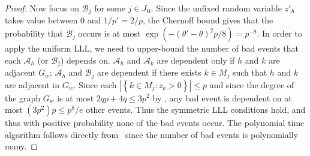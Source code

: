 \documentclass[11pt]{article}
\newcommand{\set}[1]{\left\{#1\right\}}
\newcommand{\calA}{{\mathscr A}}
\newcommand{\calB}{{\mathscr B}}
\newcommand{\cA}{{\mathscr A}}
\newcommand{\cB}{\mathscr{B}}
\newcommand{\sfH}{{\mathsf H}}
\begin{document}
\begin{proof}
Now focus on ${\calB}_j$ for some $j \in {J_\sfH}$.  Since the unfixed random variable $z'_h$ takes value between $0$ and $1/p' = 2/p$, the Chernoff bound gives that the probability that ${\calB}_j$ occurs is at most $\exp\left(-(\theta' - \theta)^2p/8\right) = p^{-8}$.
In order to apply the uniform LLL,  we need to upper-bound the number of bad events that each ${\calA}_h$ (or ${\calB}_j$) depends on.  
$\cA_h$ and $\cA_k$ are dependent only if $h$ and $k$ are adjacent $G_w$; $\cA_h $ and $\cB_j$ are dependent if there exists $k\in M_j$ such that $h$ and $k$ are adjacent in $G_w$. 
Since each $|\set{k \in M_j:z_k > 0}| \leq p$ and  since the degree of the graph $G_w$ is at most $2qp + 4q \leq 3p^2$ by ,  any bad event is dependent on at most $(3p^2)p \leq p^8/e$ other events.  Thus the symmetric LLL conditions hold, and thus with positive probability none of the bad events occur.
The polynomial time algorithm follows directly from~\cite{MT10} since the number of bad events is polynomially many.
\end{proof}
\end{document}
